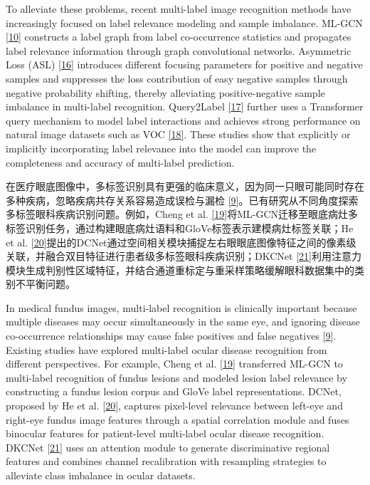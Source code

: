 To alleviate these problems, recent multi-label image recognition methods have increasingly focused on label relevance modeling and sample imbalance. ML-GCN \hyperref[_Ref213949382]{{[}10{]}} constructs a label graph from label co-occurrence statistics and propagates label relevance information through graph convolutional networks. Asymmetric Loss (ASL) \hyperref[_Ref213949927]{{[}16{]}} introduces different focusing parameters for positive and negative samples and suppresses the loss contribution of easy negative samples through negative probability shifting, thereby alleviating positive-negative sample imbalance in multi-label recognition. Query2Label \hyperref[_Ref213950246]{{[}17{]}} further uses a Transformer query mechanism to model label interactions and achieves strong performance on natural image datasets such as VOC \hyperref[_Ref213950282]{{[}18{]}}. These studies show that explicitly or implicitly incorporating label relevance into the model can improve the completeness and accuracy of multi-label prediction.

在医疗眼底图像中，多标签识别具有更强的临床意义，因为同一只眼可能同时存在多种疾病，忽略疾病共存关系容易造成误检与漏检 \hyperref[_Ref213949362]{{[}9{]}}。已有研究从不同角度探索多标签眼科疾病识别问题。例如，Cheng et al. \hyperref[_Ref213950349]{{[}19{]}}将ML-GCN迁移至眼底病灶多标签识别任务，通过构建眼底病灶语料和GloVe标签表示建模病灶标签关联；He et al. \hyperref[_Ref213950338]{{[}20{]}}提出的DCNet通过空间相关模块捕捉左右眼眼底图像特征之间的像素级关联，并融合双目特征进行患者级多标签眼科疾病识别；DKCNet \hyperref[_Ref213950343]{{[}21{]}}利用注意力模块生成判别性区域特征，并结合通道重标定与重采样策略缓解眼科数据集中的类别不平衡问题。

In medical fundus images, multi-label recognition is clinically important because multiple diseases may occur simultaneously in the same eye, and ignoring disease co-occurrence relationships may cause false positives and false negatives \hyperref[_Ref213949362]{{[}9{]}}. Existing studies have explored multi-label ocular disease recognition from different perspectives. For example, Cheng et al. \hyperref[_Ref213950349]{{[}19{]}} transferred ML-GCN to multi-label recognition of fundus lesions and modeled lesion label relevance by constructing a fundus lesion corpus and GloVe label representations. DCNet, proposed by He et al. \hyperref[_Ref213950338]{{[}20{]}}, captures pixel-level relevance between left-eye and right-eye fundus image features through a spatial correlation module and fuses binocular features for patient-level multi-label ocular disease recognition. DKCNet \hyperref[_Ref213950343]{{[}21{]}} uses an attention module to generate discriminative regional features and combines channel recalibration with resampling strategies to alleviate class imbalance in ocular datasets.

